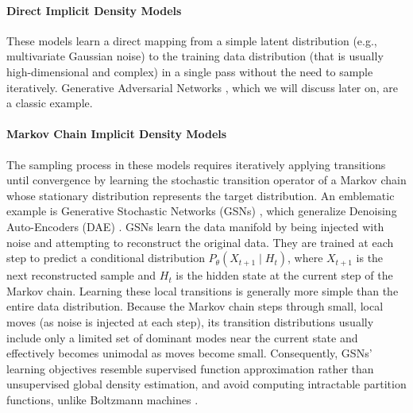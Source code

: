 \paragraph*{Direct Implicit Density Models}
These models learn a direct mapping from a simple latent distribution (e.g., multivariate Gaussian noise) to the training data distribution (that is usually high-dimensional and complex) in a single pass without the need to sample iteratively. Generative Adversarial Networks \cite{goodfellow2020generative}, which we will discuss later on, are a classic example. 


\paragraph*{Markov Chain Implicit Density Models}
The sampling process in these models requires iteratively applying transitions until convergence by learning the stochastic transition operator of a Markov chain whose stationary distribution represents the target distribution. An emblematic example is Generative Stochastic Networks (GSNs) \cite{alain2016gsns}, which generalize Denoising Auto-Encoders (DAE) \cite{vincent2010stacked}.  GSNs learn the data manifold by being injected with noise and attempting to reconstruct the original data. They are trained at each step to predict a conditional distribution $P_\theta\!\left(X_{t+1} \mid H_t\right)$, where $X_{t+1}$ is the next reconstructed sample and $H_t$ is the hidden state at the current step of the Markov chain. Learning these local transitions is generally more simple than the entire data distribution. Because the Markov chain steps through small, local moves (as noise is injected at each step), its transition distributions usually include only a limited set of dominant modes near the current state and effectively becomes unimodal as moves become small. Consequently, GSNs' learning objectives resemble supervised function approximation rather than unsupervised global density estimation, and avoid computing intractable partition functions, unlike Boltzmann machines \cite{hinton1984boltzmann}.

